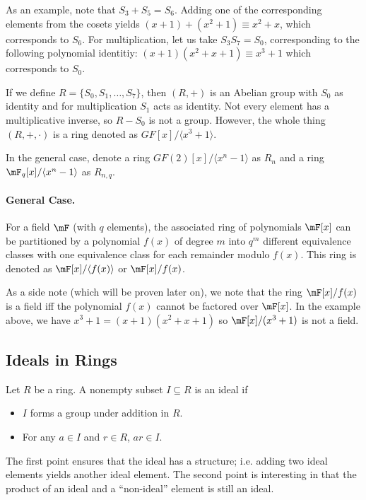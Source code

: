 As an example, note that $S_3 + S_5 = S_6$. Adding one of the corresponding elements from the cosets yields $(x+1) + (x^2+1) \equiv x^2+x$, which corresponds to $S_6$. For multiplication, let us take $S_3 S_7 = S_0$, corresponding to the following polynomial identitiy: $(x+1)(x^2+x+1) \equiv x^3+1$ which corresponds to $S_0$.

If we define $R=\{S_0, S_1,\ldots, S_7\}$, then $(R,+)$ is an Abelian group with $S_0$ as identity and for multiplication $S_1$ acts as identity. Not every element has a multiplicative inverse, so $R - S_0$ is not a group. However, the whole thing $(R,+,\cdot)$ is a ring denoted as $GF[x]/\langle x^3+1 \rangle$.

In the general case, denote a ring $GF(2)[x]/\langle x^n-1 \rangle$ as $R_n$ and a ring $\mF_q[x]/\langle x^n-1\rangle$ as $R_{n,q}$.

\paragraph{General Case.} For a field $\mF$ (with $q$ elements), the associated ring of polynomials $\mF[x]$ can be partitioned by a polynomial $f(x)$ of degree $m$ into $q^m$ different equivalence classes with one equivalence class for each remainder modulo $f(x)$. This ring is denoted as $\mF[x]/\langle f(x)\rangle$ or $\mF[x]/f(x)$.

As a side note (which will be proven later on), we note that the ring $\mF[x]/f(x)$ is a field iff the polynomial $f(x)$ cannot be factored over $\mF[x]$. In the example above, we have $x^3+1 = (x+1)(x^2+x+1)$ so $\mF[x]/(x^3+1)$ is not a field.



\subsection{Ideals in Rings}

\begin{definition}
  Let $R$ be a ring. A nonempty subset $I \subseteq R$ is an ideal if

  \begin{itemize}
    \item $I$ forms a group under addition in $R$.
    \item For any $a \in I$ and $r \in R$, $ar \in I$.
  \end{itemize}
\end{definition}

The first point ensures that the ideal has a structure; i.e. adding two ideal elements yields another ideal element. The second point is interesting in that the product of an ideal and a ``non-ideal'' element is still an ideal.

